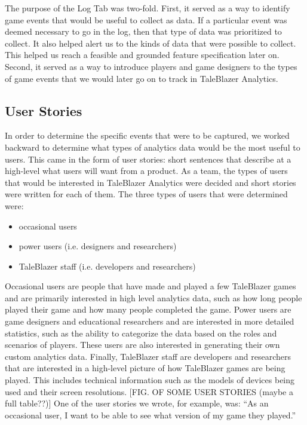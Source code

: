 The purpose of the Log Tab was two-fold. First, it served as a way to identify game events that would be useful to collect as data. If a particular event was deemed necessary to go in the log, then that type of data was prioritized to collect. It also helped alert us to the kinds of data that were possible to collect. This helped us reach a feasible and grounded feature specification later on. Second, it served as a way to introduce players and game designers to the types of game events that we would later go on to track in TaleBlazer Analytics.

\subsection{User Stories}

In order to determine the specific events that were to be captured, we worked backward to determine what types of analytics data would be the most useful to users. This came in the form of user stories: short sentences that describe at a high-level what users will want from a product. As a team, the types of users that would be interested in TaleBlazer Analytics were decided and short stories were written for each of them.
The three types of users that were determined were: 
	\begin{itemize}
		\item occasional users 
		\item power users (i.e. designers and researchers)
		\item TaleBlazer staff (i.e. developers and researchers)
	\end{itemize}

Occasional users are people that have made and played a few TaleBlazer games and are primarily interested in high level analytics data, such as how long people played their game and how many people completed the game. Power users are game designers and educational researchers and are interested in more detailed statistics, such as the ability to categorize the data based on the roles and scenarios of players. These users are also interested in generating their own custom analytics data. Finally, TaleBlazer staff are developers and researchers that are interested in a high-level picture of how TaleBlazer games are being played. This includes technical information such as the models of devices being used and their screen resolutions. [FIG. OF SOME USER STORIES (maybe a full table??)] One of the user stories we wrote, for example, was: ``As an occasional user, I want to be able to see what version of my game they played.''

